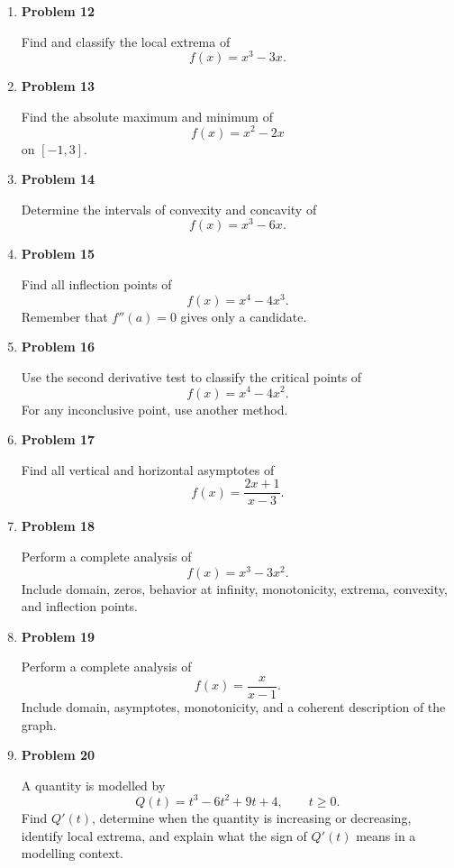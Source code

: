 \begin{enumerate}
\item \textbf{Problem 12}\par
Find and classify the local extrema of
\[
f(x)=x^3-3x.
\]

\item \textbf{Problem 13}\par
Find the absolute maximum and minimum of
\[
f(x)=x^2-2x
\]
on \([-1,3]\).

\item \textbf{Problem 14}\par
Determine the intervals of convexity and concavity of
\[
f(x)=x^3-6x.
\]

\item \textbf{Problem 15}\par
Find all inflection points of
\[
f(x)=x^4-4x^3.
\]
Remember that \(f''(a)=0\) gives only a candidate.

\item \textbf{Problem 16}\par
Use the second derivative test to classify the critical points of
\[
f(x)=x^4-4x^2.
\]
For any inconclusive point, use another method.

\item \textbf{Problem 17}\par
Find all vertical and horizontal asymptotes of
\[
f(x)=\frac{2x+1}{x-3}.
\]

\item \textbf{Problem 18}\par
Perform a complete analysis of
\[
f(x)=x^3-3x^2.
\]
Include domain, zeros, behavior at infinity, monotonicity, extrema, convexity, and inflection points.

\item \textbf{Problem 19}\par
Perform a complete analysis of
\[
f(x)=\frac{x}{x-1}.
\]
Include domain, asymptotes, monotonicity, and a coherent description of the graph.

\item \textbf{Problem 20}\par
A quantity is modelled by
\[
Q(t)=t^3-6t^2+9t+4,\qquad t\ge0.
\]
Find \(Q'(t)\), determine when the quantity is increasing or decreasing, identify local extrema, and explain what the sign of \(Q'(t)\) means in a modelling context.
\end{enumerate}
